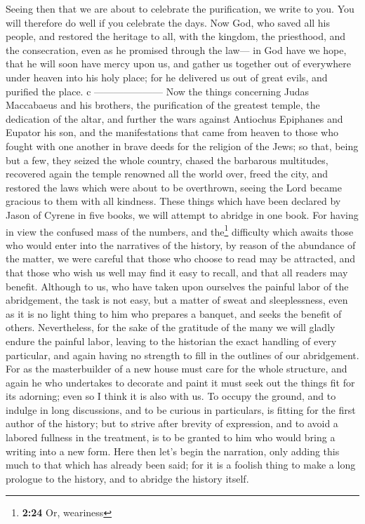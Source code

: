  Seeing then that we are about to celebrate the
purification, we write to you. You will therefore do well if you
celebrate the days.  Now God, who saved all his people,
and restored the heritage to all, with the kingdom, the priesthood, and
the consecration,  even as he promised through the law---
in God have we hope, that he will soon have mercy upon us, and gather us
together out of everywhere under heaven into his holy place; for he
delivered us out of great evils, and purified the place. c
---------------------  Now the things concerning Judas
Maccabaeus and his brothers, the purification of the greatest temple,
the dedication of the altar,  and further the wars
against Antiochus Epiphanes and Eupator his son,  and the
manifestations that came from heaven to those who fought with one
another in brave deeds for the religion of the Jews; so that, being but
a few, they seized the whole country, chased the barbarous multitudes,
 recovered again the temple renowned all the world over,
freed the city, and restored the laws which were about to be overthrown,
seeing the Lord became gracious to them with all kindness.
 These things which have been declared by Jason of Cyrene
in five books, we will attempt to abridge in one book. 
For having in view the confused mass of the numbers, and the\footnote{\textbf{2:24}
  Or, weariness} difficulty which awaits those who would enter into the
narratives of the history, by reason of the abundance of the matter,
 we were careful that those who choose to read may be
attracted, and that those who wish us well may find it easy to recall,
and that all readers may benefit.  Although to us, who
have taken upon ourselves the painful labor of the abridgement, the task
is not easy, but a matter of sweat and sleeplessness, 
even as it is no light thing to him who prepares a banquet, and seeks
the benefit of others. Nevertheless, for the sake of the gratitude of
the many we will gladly endure the painful labor, 
leaving to the historian the exact handling of every particular, and
again having no strength to fill in the outlines of our abridgement.
 For as the masterbuilder of a new house must care for
the whole structure, and again he who undertakes to decorate and paint
it must seek out the things fit for its adorning; even so I think it is
also with us.  To occupy the ground, and to indulge in
long discussions, and to be curious in particulars, is fitting for the
first author of the history;  but to strive after brevity
of expression, and to avoid a labored fullness in the treatment, is to
be granted to him who would bring a writing into a new form.
 Here then let's begin the narration, only adding this
much to that which has already been said; for it is a foolish thing to
make a long prologue to the history, and to abridge the history itself.

